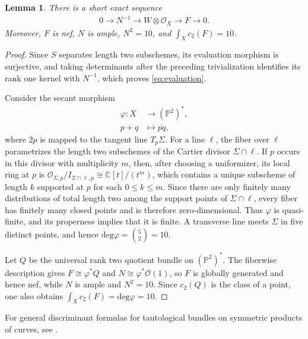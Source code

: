 \documentclass[oneside,11pt]{amsart}
\newtheorem{lem}[thm]{Lemma}
\theoremstyle{definition}
\theoremstyle{remark}
\numberwithin{thm}{section}
\numberwithin{equation}{section}
\begin{document}
\begin{lem}\label{lem:tautological}
There is a short exact sequence
\begin{align}\label{eq:evaluation}
 0\longrightarrow N^{-1}\longrightarrow W\otimes\mathcal{O}_X
 \longrightarrow F\longrightarrow0.
\end{align}
Moreover, $F$ is nef, $N$ is ample, $N^2=10$, and $\int_Xc_2(F)=10$.
\end{lem}


\begin{proof}
Since $S$ separates length two subschemes, its evaluation morphism is surjective, and taking determinants after the preceding trivialization identifies its rank one kernel with $N^{-1}$, which proves \eqref{eq:evaluation}.

Consider the secant morphism
\begin{align*}
   \varphi:X&\longrightarrow(\mathbb{P}^2)^*,\\
 p+q&\longmapsto\overline{pq}, 
\end{align*}
where $2p$ is mapped to the tangent line $T_p\Sigma$.  For a line $\ell$, the fiber over $\ell$ parametrizes the length two subschemes of the Cartier divisor $\Sigma\cap\ell$.  If $p$ occurs in this divisor with multiplicity $m$, then, after choosing a uniformizer, its local ring at $p$ is
$\mathcal{O}_{\Sigma,p}/I_{\Sigma\cap\ell,p}\cong\mathbb{C}[t]/(t^m)$, which contains a unique subscheme of length $k$ supported at $p$ for each $0\leq k\leq m$.  Since there are only finitely many distributions of total length two among the support points of $\Sigma\cap\ell$, every fiber has finitely many closed points and is therefore zero-dimensional.  Thus
$\varphi$ is quasi-finite, and its properness implies that it is finite.  A transverse line meets $\Sigma$ in five distinct points, and hence $\mathrm{deg}\varphi=\binom{5}{2}=10$.

Let $Q$ be the universal rank two quotient bundle on
$(\mathbb{P}^2)^*$.  The fiberwise description gives
$F\cong\varphi^*Q$ and $N\cong\varphi^*\mathcal{O}(1)$, so $F$ is globally generated and hence nef, while $N$ is ample and $N^2=10$.  Since $c_2(Q)$ is the class of a point, one also obtains $\int_Xc_2(F)=\mathrm{deg}\varphi=10$.
\end{proof}



For general discriminant formulas for tautological bundles on symmetric
products of curves, see \cite[Theorem~1.1]{Kru25}.
\end{document}
